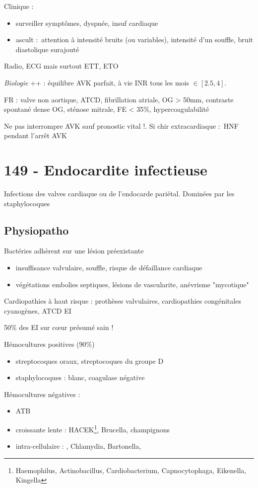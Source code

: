 Clinique : 
\begin{itemize}
  \item surveiller symptômes, dyspnée, insuf cardiaque
  \item ascult : attention à \dec intensité bruits (ou variables), \inc
    intensité d'un souffle, bruit diastolique surajouté
\end{itemize}
Radio, ECG mais surtout ETT, ETO

\textit{Biologie} ++ : équilibre AVK parfait, à vie \thus INR tous les mois $\in
[2.5, 4]$.

FR : valve non aortique, ATCD, fibrillation atriale, \diameter OG > 50mm,
contraste spontané dense OG, sténose mitrale, FE < 35\%, hypercoagulabilité

Ne pas interrompre AVK sauf pronostic vital !. Si chir extracardiaque : HNF
pendant l'arrêt AVK

\section{149 - Endocardite infectieuse}%
\label{sec:149_endocardite_infectieuse}
Infections des valves cardiaque ou de l'endocarde pariétal. Dominées par les
staphylocoques

\subsection{Physiopatho}
Bactéries adhèrent sur une lésion préexistante \thus
\begin{itemize}
  \item insuffisance valvulaire, souffle, risque de défaillance cardiaque
  \item végétations \thus embolies septiques, lésions de vascularite, anévrisme
    "mycotique"
\end{itemize}

Cardiopathies à haut risque : prothèses valvulaires, cardiopathies congénitales
cyanogènes, ATCD EI

50\% des EI sur c\oe{}ur présumé sain !

Hémocultures positives (90\%)
\begin{itemize}
  \item streptocoques oraux, streptocoques du groupe D
  \item staphylocoques : blanc, coagulase négative
\end{itemize}
Hémocultures négatives :
\begin{itemize}
   \item ATB
   \item croissante lente : HACEK\footnote{Haemophilus, Actinobacillus,
       Cardiobacterium, Capnocytophaga, Eikenella, Kingella}, Brucella, champignons
   \item intra-cellulaire : , Chlamydia, Bartonella,
\end{itemize}

